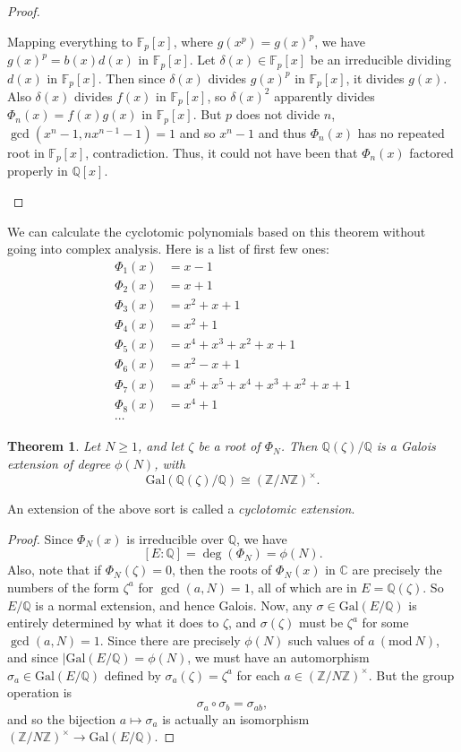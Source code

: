\documentclass[12pt]{report}
\newtheorem{theorem}{Theorem}[section]
\theoremstyle{definition}
\newcommand{\Gal}{\text{Gal}}
\newcommand{\ZZ}{\mathbb{Z}}
\newcommand{\CC}{\mathbb{C}}
\newcommand{\QQ}{\mathbb{Q}}
\newcommand{\FF}{\mathbb{F}}
\begin{document}
\begin{proof}
\begin{enumerate}
		      Mapping everything to $\FF_p[x]$, where $g(x^p) = g(x)^p$, we have $g(x)^p= b(x)d(x)$ in $\FF_p[x]$. Let $\delta(x) \in \FF_p[x]$ be an irreducible dividing $d(x)$ in $\FF_p[x]$. Then since $\delta(x)$ divides $g(x)^p$ in $\FF_p[x]$, it divides $g(x)$. Also $\delta(x)$ divides $f(x)$ in $\FF_p[x]$, so $\delta(x)^2$ apparently divides $\Phi_n(x) = f(x)g(x)$ in $\FF_p[x]$. But $p$ does not divide $n$, $\gcd(x^n-1,nx^{n-1}-1) = 1$ and so $x^n-1$ and thus $\Phi_n(x)$ has no repeated root in $\FF_p[x]$, contradiction. Thus, it could not have been that $\Phi_n(x)$ factored properly in $\QQ[x]$.
	\end{enumerate}
\end{proof}

We can calculate the cyclotomic polynomials based on this theorem without going into complex analysis. Here is a list of first few ones:
\begin{align*}
	\Phi_1(x) & = x-1                     \\
	\Phi_2(x) & = x+1                     \\
	\Phi_3(x) & = x^2+x+1                 \\
	\Phi_4(x) & = x^2+1                   \\
	\Phi_5(x) & = x^4+x^3+x^2+x+1         \\
	\Phi_6(x) & = x^2-x+1                 \\
	\Phi_7(x) & = x^6+x^5+x^4+x^3+x^2+x+1 \\
	\Phi_8(x) & = x^4+1                   \\
	\cdots
\end{align*}

\begin{theorem}
	Let $N \geq 1$, and let $\zeta$ be a root of $\Phi_N$. Then $\QQ(\zeta)/\QQ$ is a Galois extension of degree $\phi(N)$, with
	$$\Gal(\QQ(\zeta)/\QQ) \cong (\ZZ/N\ZZ)^\times.$$
\end{theorem}

An extension of the above sort is called a \emph{cyclotomic extension}.

\begin{proof}
	Since $\Phi_N(x)$ is irreducible over $\QQ$, we have $$[E : \QQ] = \deg(\Phi_N) = \phi(N).$$
	Also, note that if $\Phi_N(\zeta) = 0$, then the roots of $\Phi_N(x)$ in $\CC$ are precisely the numbers of the form $\zeta^a$ for $\gcd(a,N) = 1$, all of which are in $E = \QQ(\zeta)$. So $E/\QQ$ is a normal extension, and hence Galois. Now, any $\sigma \in \Gal(E/\QQ)$ is entirely determined by what it does to $\zeta$, and $\sigma(\zeta)$ must be $\zeta^a$ for some $\gcd(a,N) = 1$. Since there are precisely $\phi(N)$ such values of $a ~(\mbox{mod}~ N)$, and since $|\Gal(E/\QQ) = \phi(N)$, we must have an automorphism $\sigma_a \in \Gal(E/\QQ)$ defined by $\sigma_a(\zeta) = \zeta^a$ for each $a \in (\ZZ/N\ZZ)^\times$. But the group operation is $$\sigma_a \circ \sigma_b = \sigma_{ab},$$
	and so the bijection $a \mapsto \sigma_a$ is actually an isomorphism $(\ZZ/N\ZZ)^\times \to \Gal(E/\QQ)$.
\end{proof}
\end{document}
